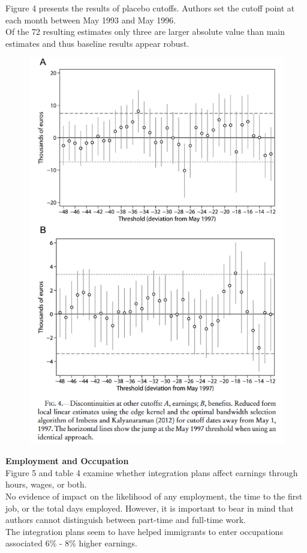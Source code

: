 \documentclass[../root]{subfiles}
\begin{document}
    Figure 4 presents the results of placebo cutoffs. Authors set the cutoff point at each month between May 1993 and May 1996. \\
    Of the 72  resulting estimates only three are larger absolute value than main estimates and thus baseline results appear robust.
    \begin{figure}[h]
        \includegraphics[width=12cm]{0703sugiyama/Figure4.png}
    \end{figure}
    
    {\bf Employment and Occupation} \\
    Figure 5 and table 4 examine whether integration plans affect earnings through hours, wages, or both. \\
    
    No evidence of impact on the likelihood of any employment, the time to the first job, or the total days employed. However, it is important to bear in mind that authors cannot distinguish between part-time and full-time work. \\
    The integration plans seem to have helped immigrants to enter occupations associated 6\% - 8\% higher earnings.
    
\end{document}
